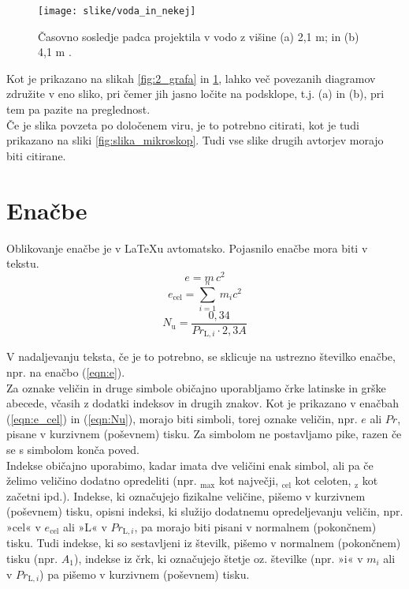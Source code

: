 \begin{figure}[ht!]
\begin{centering}
  \texttt{[image: slike/voda\_in\_nekej]}
  \caption{Časovno sosledje padca projektila v vodo z višine (a) 2,1 m; in (b) 4,1 m \cite{Gonzalez_2014}.} \label{fig:voda_in_nekej}
\end{centering}
\end{figure}

Kot je prikazano na slikah \ref{fig:2_grafa} in \ref{fig:voda_in_nekej}, lahko več povezanih diagramov združite v eno sliko, pri čemer jih jasno ločite na podsklope, t.j. (a) in (b), pri tem pa pazite na preglednost.\\

Če je slika povzeta po določenem viru, je to potrebno citirati, kot je tudi prikazano na sliki \ref{fig:slika_mikroskop}. Tudi vse slike drugih avtorjev morajo biti citirane.

\section{Enačbe}\label{sec:enacbe}

Oblikovanje enačbe je v \LaTeX u avtomatsko. Pojasnilo enačbe mora biti v tekstu.
\begin{equation}\label{eqn:e}
e = m\,c^2
\end{equation}
\begin{equation}\label{eqn:e_cel}
e_{\text{cel}}=\sum_{i=1}^{n}\,m_{i}c^2
\end{equation}
\begin{equation}\label{eqn:Nu}
N_{\text{u}} = \frac{0{,}34}{Pr_{\text{L},i}\cdot 2{,}3A}
\end{equation}

V nadaljevanju teksta, če je to potrebno, se sklicuje na ustrezno številko enačbe, npr. na enačbo (\ref{eqn:e}).\\

Za oznake veličin in druge simbole običajno uporabljamo črke latinske in grške abecede, včasih z dodatki indeksov in drugih znakov. Kot je prikazano v enačbah (\ref{eqn:e_cel}) in (\ref{eqn:Nu}), morajo biti simboli, torej oznake veličin, npr. $e$ ali $Pr$, pisane v kurzivnem (poševnem) tisku. Za simbolom ne postavljamo pike, razen če se s simbolom konča poved.\\

Indekse običajno uporabimo, kadar imata dve veličini enak simbol, ali pa če želimo veličino dodatno opredeliti (npr. $_{\text{max}}$ kot največji, $_{\text{cel}}$ kot celoten, $_{\text{z}}$ kot začetni ipd.). Indekse, ki označujejo fizikalne veličine, pišemo v kurzivnem (poševnem) tisku, opisni indeksi, ki služijo dodatnemu opredeljevanju veličin, npr. »cel« v $e_{\text{cel}}$ ali »L« v $Pr_{\text{L},i}$, pa morajo biti pisani v normalnem (pokončnem) tisku. Tudi indekse, ki so sestavljeni iz številk, pišemo v normalnem (pokončnem) tisku (npr. $A_1$), indekse iz črk, ki označujejo štetje oz. številke (npr. »i« v $m_i$ ali v $Pr_{\text{L},i}$) pa pišemo v kurzivnem (poševnem) tisku.\\


